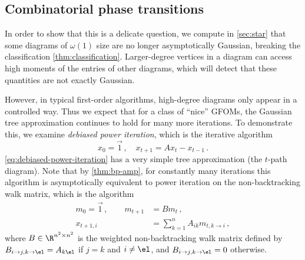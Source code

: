 \documentclass[12pt]{article}
\begin{document}
\subsection{Combinatorial phase transitions}
\label{sec:combi-obstructions}

In order to show that this is a delicate question, we compute in \cref{sec:star}
that some diagrams of $\omega(1)$ size are no longer asymptotically Gaussian,
breaking the classification \cref{thm:classification}.
Larger-degree vertices in a diagram can access high moments
of the entries of other diagrams, which will detect that these quantities are not exactly Gaussian.


However, in typical first-order algorithms, high-degree diagrams only appear in a controlled way.
Thus we expect that for a class of ``nice'' GFOMs, the Gaussian tree approximation
continues to hold for many more iterations.
To demonstrate this, we examine \textit{debiased power iteration}, which is the iterative algorithm
\begin{equation}
     x_0=\vec{1}\,,\quad x_{t+1} = Ax_t - x_{t-1}\,.\label{eq:debiased-power-iteration}
\end{equation}
\cref{eq:debiased-power-iteration}
has a very simple tree approximation (the $t$-path diagram).
Note that by \cref{thm:bp-amp}, for constantly many iterations this algorithm is asymptotically equivalent to power iteration
on the non-backtracking walk matrix, which is the algorithm
\begin{align*}
    m_{0} = \vec{1}\,, \qquad m_{t+1} &= B m_{t}\,,\\
    x_{t+1,i} &= \sum_{k = 1}^n A_{ik} m_{t,k \to i}\,,
\end{align*}
where $B \in \R^{n^2 \times n^2}$ is the weighted non-backtracking walk matrix defined by $B_{i\to j,k\to \el} = A_{k\el}$ if $j=k$ and $i\neq \el$, and $B_{i\to j,k\to\el}=0$ otherwise.
\end{document}
